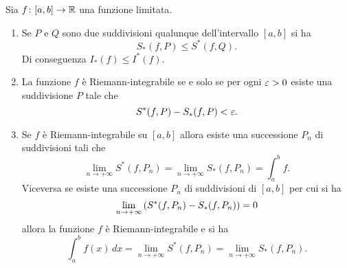 \begin{theorem}
\label{th:criteri_integrabilita}
\mymark{*}
Sia $f\colon[a,b]\to \mathbb R$ una funzione limitata.
\begin{enumerate}
\item
Se $P$ e $Q$ sono due suddivisioni qualunque dell'intervallo
$[a,b]$ si ha
\[
  S_*(f,P) \le S^*(f,Q).
\]
Di conseguenza $I_*(f) \le I^*(f)$.

\item
La funzione $f$ è Riemann-integrabile se e solo se
per ogni $\varepsilon>0$ esiste una suddivisione $P$
tale che
\[
  S^*(f,P) - S_*(f,P) < \varepsilon.
\]

\item
Se $f$ è Riemann-integrabile su $[a,b]$ allora
esiste una successione $P_n$ di suddivisioni tali che
\begin{equation}\label{eq:93765}
  \lim_{n\to +\infty} S^*(f,P_n)
  = \lim_{n\to+\infty} S_*(f,P_n)
  = \int_a^b f.
\end{equation}
Viceversa se esiste una successione $P_n$ di suddivisioni di $[a,b]$
per cui si ha
\begin{equation*}
  \lim_{n\to +\infty} {\left( S^*(f,P_n) - S_*(f,P_n) \right)} = 0
\end{equation*}
allora la funzione $f$ è Riemann-integrabile e si ha
\[
  \int_a^b f(x)\, dx = \lim_{n\to+\infty} S^*(f,P_n) = \lim_{n\to+\infty} S_*(f,P_n).
\]
\end{enumerate}
\end{theorem}
%

